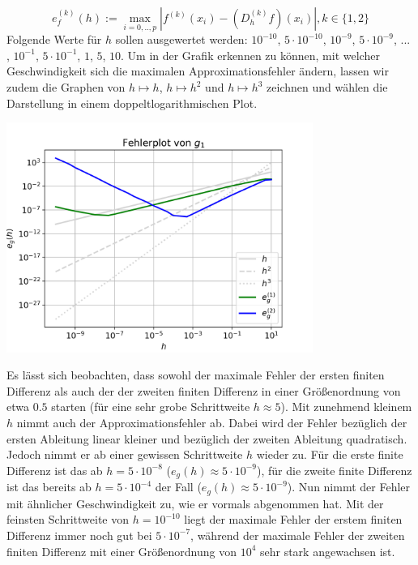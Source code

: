 \documentclass{scrartcl}
\newcommand{\abs}[1]{\left\lvert#1\right\rvert}
\begin{document}
\[e_f^{(k)}(h):=\max_{i=0,..,p}\abs{f^{(k)}(x_i)-(D_h^{(k)}f)(x_i)} , k \in \lbrace1, 2\rbrace\]
Folgende Werte für $h$ sollen ausgewertet werden: $10^{-10}$, $5 \cdot 10^{-10}$, $10^{-9}$, $5 \cdot 10^{-9}$, ... , $10^{-1}$, $5 \cdot 10^{-1}$, $1$, $5$, $10$.
Um in der Grafik erkennen zu können, mit welcher Geschwindigkeit sich die maximalen Approximationsfehler ändern, lassen wir zudem die Graphen von $h \mapsto h$, $h \mapsto h^{2}$ und $h \mapsto h^{3}$ zeichnen und wählen die Darstellung in einem doppeltlogarithmischen Plot.
\begin{center}
	\includegraphics[width=0.75\textwidth]{Grafiken/Fehlerplot_Aufgabe2}
  \vspace{-0.2cm}
  \vspace{0.5cm}
\end{center}
Es lässt sich beobachten, dass sowohl der maximale Fehler der ersten finiten Differenz als auch der der zweiten finiten Differenz in einer Größenordnung von etwa $0.5$ starten (für eine sehr grobe Schrittweite $h \approx 5$). Mit zunehmend kleinem $h$ nimmt auch der Approximationsfehler ab. Dabei wird der Fehler bezüglich der ersten Ableitung linear kleiner und bezüglich der zweiten Ableitung quadratisch. Jedoch nimmt er ab einer gewissen Schrittweite $h$ wieder zu. Für die erste finite Differenz ist das ab $h = 5\cdot10^{-8}$ ($e_g(h) \approx  5 \cdot 10^{-9}$), für die zweite finite Differenz ist das bereits ab $h = 5 \cdot 10^{-4}$ der Fall ($e_g(h) \approx  5 \cdot 10^{-9}$). Nun nimmt der Fehler mit ähnlicher Geschwindigkeit zu, wie er vormals abgenommen hat. Mit der feinsten Schrittweite von $h = 10^{-10}$ liegt der maximale Fehler der erstem finiten Differenz immer noch gut bei $5 \cdot 10^{-7}$, während der maximale Fehler der zweiten finiten Differenz mit einer Größenordnung von $10^{4}$ sehr stark angewachsen ist.
\end{document}
